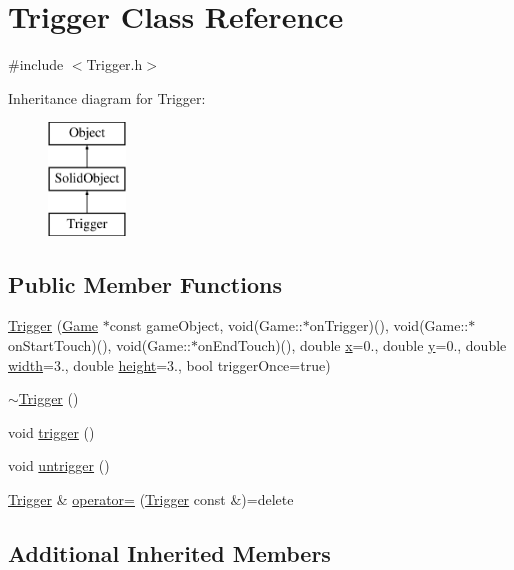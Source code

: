 \hypertarget{class_trigger}{}\section{Trigger Class Reference}
\label{class_trigger}


{\ttfamily \#include $<$Trigger.\+h$>$}

Inheritance diagram for Trigger\+:\begin{figure}[H]
\begin{center}
\leavevmode
\includegraphics[height=3.000000cm]{class_trigger}
\end{center}
\end{figure}
\subsection*{Public Member Functions}
\begin{DoxyCompactItemize}
\item 
\hyperlink{class_trigger_aa3067e36467650cb24140cee1d66783c}{Trigger} (\hyperlink{class_game}{Game} $\ast$const game\+Object, void(Game\+::$\ast$on\+Trigger)(), void(Game\+::$\ast$on\+Start\+Touch)(), void(Game\+::$\ast$on\+End\+Touch)(), double \hyperlink{class_object_a02010c1708632be33a760486b1f648f8}{x}=0., double \hyperlink{class_object_a542c4d6094ace575fb4a28f46b9cc6a1}{y}=0., double \hyperlink{class_object_a3afad0ab476968e517b6f48c2a32719f}{width}=3., double \hyperlink{class_object_a811bf2cbf614c4f0a3935a83fb639ffd}{height}=3., bool trigger\+Once=true)
\item 
\hyperlink{class_trigger_a1a2d107dd06737f51c81c4897c75e59d}{$\sim$\+Trigger} ()
\item 
void \hyperlink{class_trigger_ab5b020f8a583373f58ced6b7f01a8393}{trigger} ()
\item 
void \hyperlink{class_trigger_ad057434232243a59bd83306516a288ee}{untrigger} ()
\item 
\hyperlink{class_trigger}{Trigger} \& \hyperlink{class_trigger_ada2d3f1624610219bde159ee14b5ed96}{operator=} (\hyperlink{class_trigger}{Trigger} const \&)=delete
\end{DoxyCompactItemize}
\subsection*{Additional Inherited Members}


